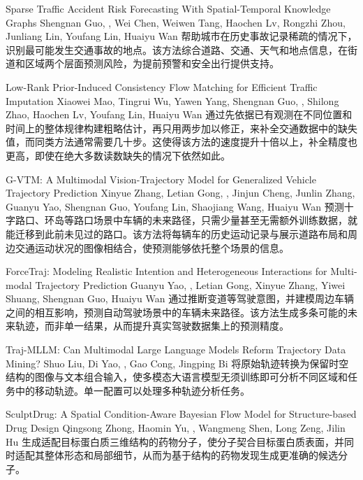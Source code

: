 {Sparse Traffic Accident Risk Forecasting With Spatial-Temporal Knowledge Graphs}
{Shengnan Guo, \me, Wei Chen, Weiwen Tang, Haochen Lv, Rongzhi Zhou, Junliang Lin, Youfang Lin, Huaiyu Wan}
{帮助城市在历史事故记录稀疏的情况下，识别最可能发生交通事故的地点。该方法综合道路、交通、天气和地点信息，在街道和区域两个层面预测风险，为提前预警和安全出行提供支持。}

{Low-Rank Prior-Induced Consistency Flow Matching for Efficient Traffic Imputation}
{Xiaowei Mao, Tingrui Wu, Yawen Yang, Shengnan Guo, \me, Shilong Zhao, Haochen Lv, Youfang Lin, Huaiyu Wan}
{通过先依据已有观测在不同位置和时间上的整体规律构建粗略估计，再只用两步加以修正，来补全交通数据中的缺失值，而同类方法通常需要几十步。这使得该方法的速度提升十倍以上，补全精度也更高，即使在绝大多数读数缺失的情况下依然如此。}

{G-VTM: A Multimodal Vision-Trajectory Model for Generalized Vehicle Trajectory Prediction}
{Xinyue Zhang, Letian Gong, \me, Jinjun Cheng, Junlin Zhang, Guanyu Yao, Shengnan Guo, Youfang Lin, Shaojiang Wang, Huaiyu Wan}
{预测十字路口、环岛等路口场景中车辆的未来路径，只需少量甚至无需额外训练数据，就能迁移到此前未见过的路口。该方法将每辆车的历史运动记录与展示道路布局和周边交通运动状况的图像相结合，使预测能够依托整个场景的信息。}

{ForceTraj: Modeling Realistic Intention and Heterogeneous Interactions for Multi-modal Trajectory Prediction}
{Guanyu Yao, \me, Letian Gong, Xinyue Zhang, Yiwei Shuang, Shengnan Guo, Huaiyu Wan}
{通过推断变道等驾驶意图，并建模周边车辆之间的相互影响，预测自动驾驶场景中的车辆未来路径。该方法生成多条可能的未来轨迹，而非单一结果，从而提升真实驾驶数据集上的预测精度。}

{Traj-MLLM: Can Multimodal Large Language Models Reform Trajectory Data Mining?}
{Shuo Liu, Di Yao, \me, Gao Cong, Jingping Bi}
{将原始轨迹转换为保留时空结构的图像与文本组合输入，使多模态大语言模型无须训练即可分析不同区域和任务中的移动轨迹。单一配置可以处理多种轨迹分析任务。}

{SculptDrug: A Spatial Condition-Aware Bayesian Flow Model for Structure-based Drug Design}
{Qingsong Zhong, Haomin Yu, \me, Wangmeng Shen, Long Zeng, Jilin Hu}
{生成适配目标蛋白质三维结构的药物分子，使分子契合目标蛋白质表面，并同时适配其整体形态和局部细节，从而为基于结构的药物发现生成更准确的候选分子。}

